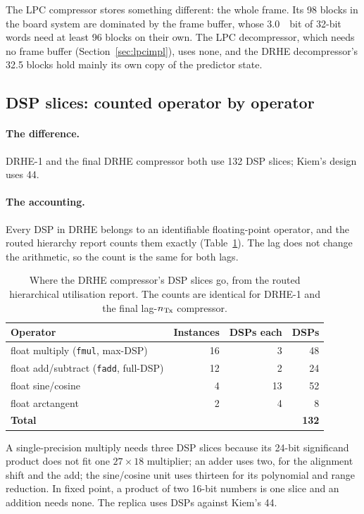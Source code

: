 The LPC compressor stores something different: the whole frame. Its 98 blocks
in the board system are dominated by the frame buffer, whose \SI{3.0}{\mebi bit}
of 32-bit words need at least 96 blocks on their own. The LPC decompressor,
which needs no frame buffer (Section~\ref{sec:lpcimpl}), uses none, and the DRHE
decompressor's 32.5 blocks hold mainly its own copy of the predictor state.

\subsection{DSP slices: counted operator by operator}
\label{sec:hw_dsp}

\paragraph{The difference.} DRHE-1 and the final DRHE compressor both use 132
DSP slices; Kiem's design uses 44.

\paragraph{The accounting.} Every DSP in DRHE belongs to an identifiable
floating-point operator, and the routed hierarchy report counts them exactly
(Table~\ref{tab:hw_dspcount}). The lag does not change the arithmetic, so the
count is the same for both lags.

\begin{table}[htbp]
\centering
\caption[Where the DRHE compressor's DSP slices go]{Where the DRHE
compressor's DSP slices go, from the routed hierarchical utilisation report.
The counts are identical for DRHE-1 and the final lag-$n_{\mathrm{Tx}}$ compressor.}
\label{tab:hw_dspcount}
\small
\begin{tabular}{@{}lrrr@{}}
\toprule
Operator & Instances & DSPs each & DSPs\\
\midrule
float multiply (\texttt{fmul}, max-DSP) & 16 & 3  & 48\\
float add/subtract (\texttt{fadd}, full-DSP) & 12 & 2 & 24\\
float sine/cosine & 4 & 13 & 52\\
float arctangent  & 2 & 4  & 8\\
\midrule
\textbf{Total} & & & \textbf{132}\\
\bottomrule
\end{tabular}
\end{table}

\noindent
A single-precision multiply needs three DSP slices because its 24-bit
significand product does not fit one $27 \times 18$ multiplier; an adder uses
two, for the alignment shift and the add; the sine/cosine unit uses thirteen for
its polynomial and range reduction. In fixed point, a product of two 16-bit
numbers is one slice and an addition needs none. The replica uses
 DSPs against Kiem's 44.

